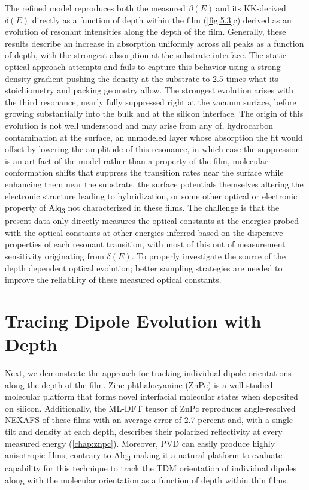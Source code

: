 The refined model reproduces both the measured \(\beta(E)\ \)and its KK-derived \(\delta(E)\) directly as a function of depth within the film (\cref{fig:5.3}c) derived as an evolution of resonant intensities along the depth of the film. Generally, these results describe an increase in absorption uniformly across all peaks as a function of depth, with the strongest absorption at the substrate interface. The static optical approach attempts and fails to capture this behavior using a strong density gradient pushing the density at the substrate to 2.5 times what its stoichiometry and packing geometry allow. The strongest evolution arises with the third resonance, nearly fully suppressed right at the vacuum surface, before growing substantially into the bulk and at the silicon interface. The origin of this evolution is not well understood and may arise from any of, hydrocarbon contamination at the surface, an unmodeled layer whose absorption the fit would offset by lowering the amplitude of this resonance, in which case the suppression is an artifact of the model rather than a property of the film, molecular conformation shifts that suppress the transition rates near the surface while enhancing them near the substrate, the surface potentials themselves altering the electronic structure leading to hybridization, or some other optical or electronic property of Alq\textsubscript{3} not characterized in these films. The challenge is that the present data only directly measures the optical constants at the energies probed with the optical constants at other energies inferred based on the dispersive properties of each resonant transition, with most of this out of measurement sensitivity originating from \(\delta(E)\). To properly investigate the source of the depth dependent optical evolution; better sampling strategies are needed to improve the reliability of these measured optical constants.

\section{Tracing Dipole Evolution with Depth}\label{sec:tracing-dipole-evolution-with-depth}

Next, we demonstrate the approach for tracking individual dipole orientations along the depth of the film. Zinc phthalocyanine (ZnPc) is a well-studied molecular platform that forms novel interfacial molecular states when deposited on silicon.\autocite{zotero-item-2198} Additionally, the ML-DFT tensor of ZnPc reproduces angle-resolved NEXAFS of these films with an average error of 2.7 percent and, with a single tilt and density at each depth, describes their polarized reflectivity at every measured energy (\cref{chap:znpc}).\autocite{murciaQuantitativeBondTraceableResonant2026,zotero-item-2198} Moreover, PVD can easily produce highly anisotropic films, contrary to Alq\textsubscript{3} making it a natural platform to evaluate capability for this technique to track the TDM orientation of individual dipoles along with the molecular orientation as a function of depth within thin films.

